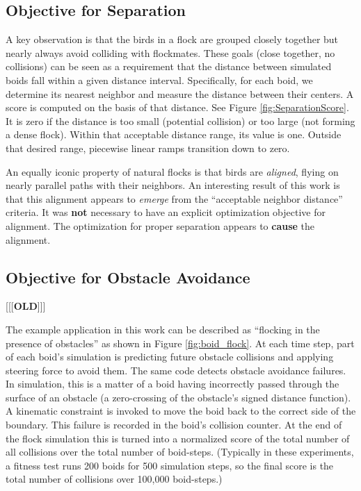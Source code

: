 \documentclass[letterpaper]{article}
\begin{document}
\subsection{Objective for Separation}
\label{subsec:separation_objective}

A key observation is that the birds in a flock are grouped closely together but nearly always avoid colliding with flockmates. These goals (close together, no collisions) can be seen as a requirement that the distance between simulated boids fall within a given distance interval. Specifically, for each boid, we determine its nearest neighbor and measure the distance between their centers. A score is computed on the basis of that distance. See Figure \ref{fig:SeparationScore}. It is zero if the distance is too small (potential collision) or too large (not forming a dense flock). Within that acceptable distance range, its value is one. Outside that desired range, piecewise linear ramps transition down to zero.

An equally iconic property of natural flocks is that birds are \textit{aligned}, flying on nearly parallel paths with their neighbors. An interesting result of this work is that this alignment appears to \textit{emerge} from the ``acceptable neighbor distance'' criteria. It was \textbf{not} necessary to have an explicit optimization objective for alignment. The optimization for proper separation appears to \textbf{cause} the alignment.

\subsection{Objective for Obstacle Avoidance}
\label{subsec:avoidance_objective}

[[[\textbf{OLD}]]]

The example application in this work can be described as ``flocking in the presence of obstacles'' as shown in Figure \ref{fig:boid_flock}. At each time step, part of each boid's simulation is predicting future obstacle collisions and applying steering force to avoid them. The same code detects obstacle avoidance failures. In simulation, this is a matter of a boid having incorrectly passed through the surface of an obstacle (a zero-crossing of the obstacle's signed distance function). A kinematic constraint is invoked to move the boid back to the correct side of the boundary. This failure is recorded in the boid's collision counter. At the end of the flock simulation this is turned into a normalized score of the total number of all collisions over the total number of boid-steps. (Typically in these experiments, a fitness test runs 200 boids for 500 simulation steps, so the final score is the total number of collisions over 100,000 boid-steps.) 
\end{document}
